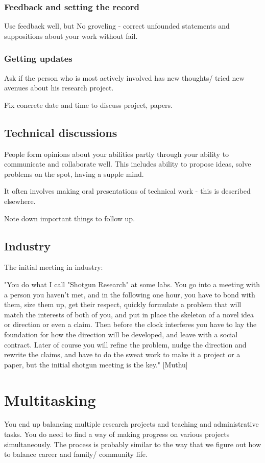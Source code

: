 \documentclass[oneside, article]{memoir}
\begin{document}
\subsubsection{Feedback and setting the record}
Use feedback well, but No groveling - correct unfounded statements and suppositions about your work without fail.

\subsubsection{Getting updates}
Ask if the person who is most actively involved has new thoughts/ tried new avenues about his research project.

Fix concrete date and time to discuss project, papers.

\subsection{Technical discussions}
People form opinions about your abilities partly through your ability to communicate and collaborate well. This includes ability to propose ideas, solve problems on the spot, having a supple mind.

It often involves making oral presentations of technical work - this is described elsewhere.

Note down important things to follow up.

\subsection{Industry}
The initial meeting in industry:

"You do what I call "Shotgun Research" at some labs. You go into a meeting with a person you haven't met, and in the following one hour, you have to bond with them, size them up, get their respect, quickly formulate a problem that will match the interests of both of you, and put in place the skeleton of a novel idea or direction or even a claim. Then before the clock interferes you have to lay the foundation for how the direction will be developed, and leave with a social contract. Later of course you will refine the problem, nudge the direction and rewrite the claims, and have to do the sweat work to make it a project or a paper, but the initial shotgun meeting is the key." [Muthu]

\section{Multitasking}
You end up balancing multiple research projects and teaching and administrative tasks. You do need to find a way of making progress on various projects simultaneously. The process is probably similar to the way that we figure out how to balance career and family/ community life.
\end{document}
